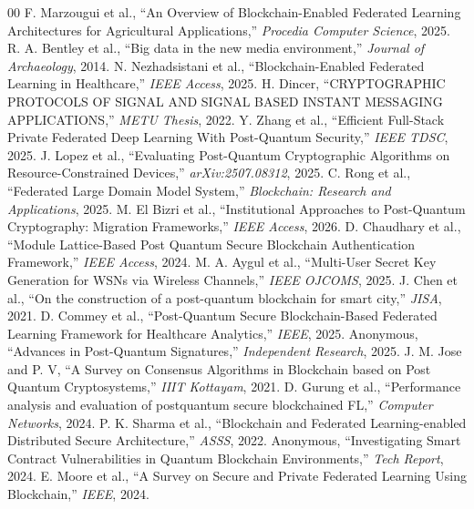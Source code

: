 \documentclass[journal, 10pt, twocolumn]{IEEEtran}
\begin{document}
\begin{thebibliography}{00}
 F. Marzougui et al., ``An Overview of Blockchain-Enabled Federated Learning Architectures for Agricultural Applications,'' \textit{Procedia Computer Science}, 2025.
 R. A. Bentley et al., ``Big data in the new media environment,'' \textit{Journal of Archaeology}, 2014.
 N. Nezhadsistani et al., ``Blockchain-Enabled Federated Learning in Healthcare,'' \textit{IEEE Access}, 2025.
 H. Dincer, ``CRYPTOGRAPHIC PROTOCOLS OF SIGNAL AND SIGNAL BASED INSTANT MESSAGING APPLICATIONS,'' \textit{METU Thesis}, 2022.
 Y. Zhang et al., ``Efficient Full-Stack Private Federated Deep Learning With Post-Quantum Security,'' \textit{IEEE TDSC}, 2025.
 J. Lopez et al., ``Evaluating Post-Quantum Cryptographic Algorithms on Resource-Constrained Devices,'' \textit{arXiv:2507.08312}, 2025.
 C. Rong et al., ``Federated Large Domain Model System,'' \textit{Blockchain: Research and Applications}, 2025.
 M. El Bizri et al., ``Institutional Approaches to Post-Quantum Cryptography: Migration Frameworks,'' \textit{IEEE Access}, 2026.
 D. Chaudhary et al., ``Module Lattice-Based Post Quantum Secure Blockchain Authentication Framework,'' \textit{IEEE Access}, 2024.
 M. A. Aygul et al., ``Multi-User Secret Key Generation for WSNs via Wireless Channels,'' \textit{IEEE OJCOMS}, 2025.
 J. Chen et al., ``On the construction of a post-quantum blockchain for smart city,'' \textit{JISA}, 2021.
 D. Commey et al., ``Post-Quantum Secure Blockchain-Based Federated Learning Framework for Healthcare Analytics,'' \textit{IEEE}, 2025.
 Anonymous, ``Advances in Post-Quantum Signatures,'' \textit{Independent Research}, 2025.
 J. M. Jose and P. V, ``A Survey on Consensus Algorithms in Blockchain based on Post Quantum Cryptosystems,'' \textit{IIIT Kottayam}, 2021.
 D. Gurung et al., ``Performance analysis and evaluation of postquantum secure blockchained FL,'' \textit{Computer Networks}, 2024.
 P. K. Sharma et al., ``Blockchain and Federated Learning-enabled Distributed Secure Architecture,'' \textit{ASSS}, 2022.
 Anonymous, ``Investigating Smart Contract Vulnerabilities in Quantum Blockchain Environments,'' \textit{Tech Report}, 2024.
 E. Moore et al., ``A Survey on Secure and Private Federated Learning Using Blockchain,'' \textit{IEEE}, 2024.

\end{thebibliography}
\end{document}
